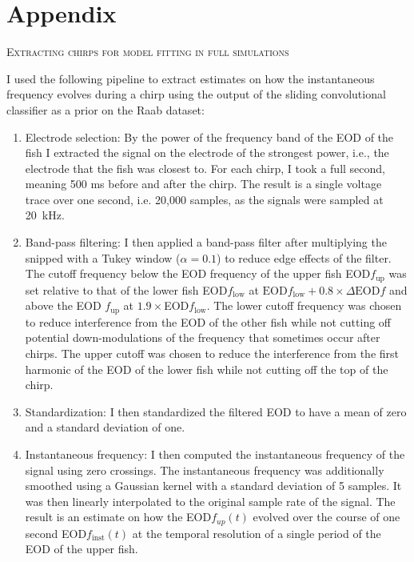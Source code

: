 \chapter{Appendix} %
\label{appendix}

\begin{center}
  \textsc{Extracting chirps for model fitting in full simulations}
\end{center}

I used the following pipeline to extract estimates on how the instantaneous
frequency evolves during a chirp using the output of the sliding convolutional
classifier as a prior on the Raab dataset:

\begin{enumerate}

  \item Electrode selection: By the power of the frequency band of the EOD of
    the fish I extracted the signal on the electrode of the strongest power,
    i.e., the electrode that the fish was closest to. For each chirp, I took a
    full second, meaning 500 \si{\milli\second} before and after the chirp. The
    result is a single voltage trace over one second, i.e. 20,000 samples, as
    the signals were sampled at \SI{20}{\kilo\hertz}.

  \item Band-pass filtering: I then applied a band-pass filter after
    multiplying the snipped with a Tukey window ($\alpha=0.1$) to reduce edge
    effects of the filter. The cutoff frequency below the EOD frequency
    of the upper fish EOD$f_{\text{up}}$ was set relative to that of the lower fish EOD$f_{\text{low}}$ at $\text{EOD}f_{\text{low}} + 0.8 \times
    \Delta\text{EOD}f$ and above the EOD $f_{\text{up}}$ at $1.9
    \times$EOD$f_{\text{low}}$. The lower cutoff frequency was chosen to reduce
    interference from the EOD of the other fish while not cutting off potential
    down-modulations of the frequency that sometimes occur after chirps. The
    upper cutoff was chosen to reduce the interference from the first harmonic
    of the EOD of the lower fish while not cutting off the top of the chirp.

  \item Standardization: I then standardized the filtered EOD to have a mean of zero
    and a standard deviation of one.

  \item Instantaneous frequency: I then computed the instantaneous frequency of
    the signal using zero crossings. The instantaneous frequency was
    additionally smoothed using a Gaussian kernel with a standard deviation of
    5 samples. It was then linearly interpolated to the original sample rate of
    the signal. The result is an estimate on how the EOD$f_{up}(t)$ evolved
    over the course of one second EOD$f_{\text{inst}}(t)$ at the temporal
    resolution of a single period of the EOD of the upper fish.


\end{enumerate}
